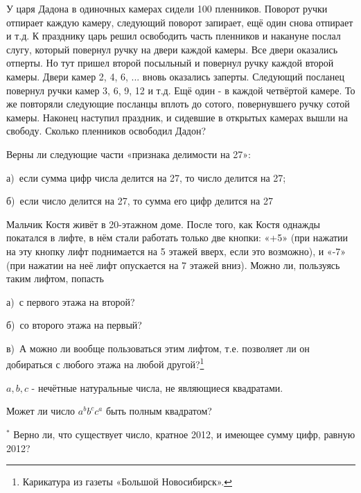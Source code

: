 \begin{thm}
    У царя Дадона в одиночных камерах сидели 100 пленников. Поворот ручки отпирает каждую камеру, следующий поворот запирает, ещё один снова отпирает и т.д. К празднику царь решил освободить часть пленников и накануне послал слугу, который повернул ручку на двери каждой камеры. Все двери оказались отперты. Но тут пришел второй посыльный и повернул ручку каждой второй камеры. Двери камер 2, 4, 6, ... вновь оказались заперты. Следующий посланец повернул ручки камер 3, 6, 9, 12 и т.д. Ещё один - в каждой четвёртой камере. То же повторяли следующие посланцы вплоть до сотого, повернувшего ручку сотой камеры. Наконец наступил праздник, и сидевшие в открытых камерах вышли на свободу. Сколько пленников освободил Дадон?
\end{thm}

\begin{thm}
    Верны ли следующие части «признака делимости на 27»:
    \par
    а)~если сумма цифр числа делится на 27, то число делится на 27;
    \par
    б)~если число делится на 27, то сумма его цифр делится на 27
\end{thm}

\begin{thm}
    Мальчик Костя живёт в 20-этажном доме. После того, как Костя однажды покатался в лифте, в нём стали работать только две кнопки: «+5» (при нажатии на эту кнопку лифт поднимается на 5 этажей вверх, если это возможно), и «-7» (при нажатии на неё лифт опускается на 7 этажей вниз). Можно ли, пользуясь таким лифтом, попасть
    \par
    а)~с первого этажа на второй? 
    \par
    б)~со второго этажа на первый? 
    \par
    в)~А можно ли вообще пользоваться этим лифтом, т.е. позволяет ли он добираться с любого этажа на любой другой?\footnote{Карикатура из газеты «Большой Новосибирск».}
\end{thm}

\begin{thm}
    $a, b, c$ - нечётные натуральные числа, не являющиеся квадратами.
    \par
    Может ли число $a^b b^c c^a$ быть полным квадратом?
\end{thm}

\begin{thm} $^{\ast}$
    Верно ли, что существует число, кратное 2012, и имеющее сумму цифр, равную 2012?
\end{thm}

